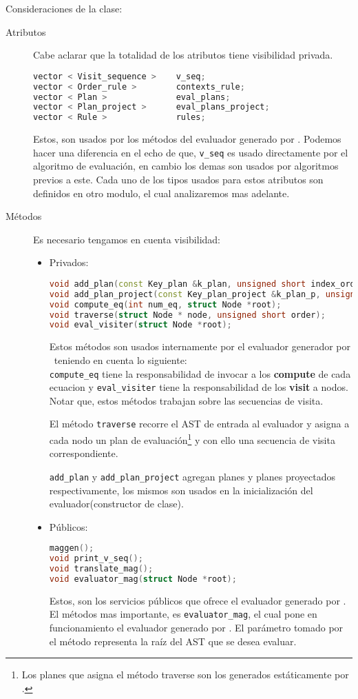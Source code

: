 Consideraciones de la clase:
\begin{description}
\item [Atributos] Cabe aclarar que la totalidad de los atributos tiene visibilidad privada.
\scriptsize 
\begin{lstlisting}[backgroundcolor=\color{white}, language=c++]
vector < Visit_sequence >    v_seq;
vector < Order_rule >        contexts_rule;
vector < Plan >              eval_plans;
vector < Plan_project >      eval_plans_project;
vector < Rule >              rules;
\end{lstlisting}
\normalsize
Estos, son usados por los métodos del evaluador generado por \maggen. Podemos hacer una diferencia en el echo de que, \texttt{v\_seq} es usado directamente por el algoritmo de evaluación, en cambio los demas son usados por algoritmos previos a este. Cada uno de los tipos usados para estos atributos son definidos en otro modulo, el cual analizaremos mas adelante.
\item [Métodos] Es necesario tengamos en cuenta visibilidad:
\begin{itemize}
\item Privados:
\scriptsize
\begin{lstlisting}[backgroundcolor=\color{white}, language=c++]
void add_plan(const Key_plan &k_plan, unsigned short index_order);
void add_plan_project(const Key_plan_project &k_plan_p, unsigned short index_order);
void compute_eq(int num_eq, struct Node *root);
void traverse(struct Node * node, unsigned short order);
void eval_visiter(struct Node *root);
\end{lstlisting}
\normalsize
Estos métodos son usados internamente por el evaluador generador por \maggen\ teniendo en cuenta lo siguiente:\\
\texttt{compute\_eq} tiene la responsabilidad de invocar a los \textbf{compute} de cada ecuacion y \texttt{eval\_visiter} tiene la responsabilidad de los \textbf{visit} a nodos. Notar que, estos métodos trabajan sobre las secuencias de visita.

El método \texttt{traverse} recorre el AST de entrada al evaluador y asigna a cada nodo un plan de evaluación\footnote{Los planes que asigna el método traverse son los generados estáticamente por \maggen.} y con ello una secuencia de visita correspondiente.

\texttt{add\_plan} y \texttt{add\_plan\_project} agregan planes y planes proyectados respectivamente, los mismos son usados en la inicialización del evaluador(constructor de clase).
\item Públicos:
\scriptsize
\begin{lstlisting}[backgroundcolor=\color{white}, language=c++]
maggen();
void print_v_seq();
void translate_mag();
void evaluator_mag(struct Node *root);
\end{lstlisting}
\normalsize
Estos, son los servicios públicos que ofrece el evaluador generado por \maggen. El métodos mas importante, es \texttt{evaluator\_mag}, el cual pone en funcionamiento el evaluador generado por \maggen. El parámetro tomado por el método representa la raíz del AST que se desea evaluar.


\end{itemize}
\end{description}
